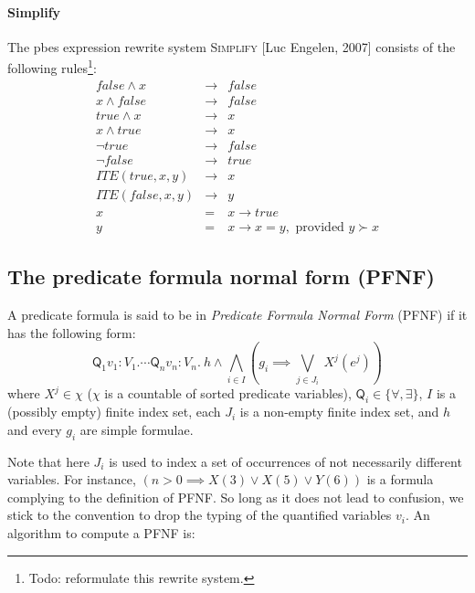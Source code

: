 \paragraph{\newpage Simplify}

The pbes expression rewrite system \textsc{Simplify} [Luc Engelen, 2007]
consists of the following rules\footnote{%
Todo: reformulate this rewrite system.}:%
\begin{eqnarray*}
false\wedge x &\rightarrow &false \\
x\wedge false &\rightarrow &false \\
true\wedge x &\rightarrow &x \\
x\wedge true &\rightarrow &x \\
\lnot true &\rightarrow &false \\
\lnot false &\rightarrow &true \\
ITE(true,x,y) &\rightarrow &x \\
ITE(false,x,y) &\rightarrow &y \\
x &=&x\rightarrow true \\
y &=&x\rightarrow x=y,\text{ provided }y\succ x
\end{eqnarray*}

\subsection{The predicate formula normal form (PFNF)}

\begin{definition}
A predicate formula is said to be in \emph{Predicate Formula Normal Form}
(PFNF) if it has the following form: 
\begin{equation*}
\mathsf{Q}_{1}v_{1}{:}V_{1}.\cdots \mathsf{Q}_{n}v_{n}{:}V_{n}.~h\wedge
\bigwedge\limits_{i\in I}\left( g_{i}\implies \bigvee\limits_{j\in
J_{i}}~X^{j}(e^{j})\right)
\end{equation*}%
where $X^{j}\in \chi $ ($\chi $ is a countable of sorted predicate
variables), $\mathsf{Q}_{i}\in \{\forall ,\exists \}$, $I$ is a (possibly
empty) finite index set, each $J_{i}$ is a non-empty finite index set, and $%
h $ and every $g_{i}$ are simple formulae.
\end{definition}

Note that here $J_{i}$ is used to index a set of occurrences of not
necessarily different variables. For instance, $(n>0\implies X(3)\vee
X(5)\vee Y(6))$ is a formula complying to the definition of PFNF. So long as
it does not lead to confusion, we stick to the convention to drop the typing
of the quantified variables $v_{i}$. An algorithm to compute a PFNF is:

